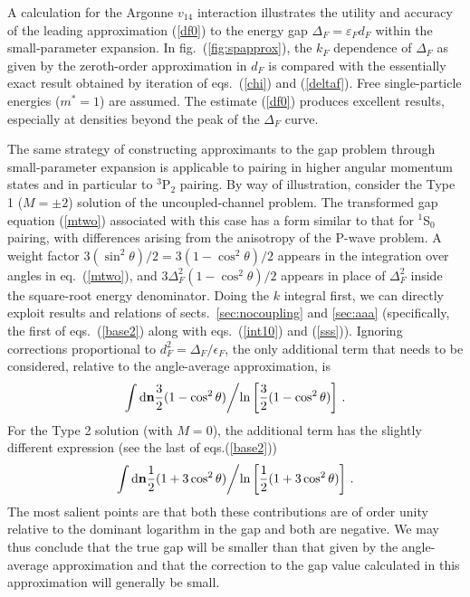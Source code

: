 A calculation for the Argonne $v_{14}$ interaction illustrates the
utility and accuracy of the leading approximation (\ref{df0}) to the
energy gap $\Delta_F=\varepsilon_Fd_F$ within the small-parameter expansion.
In fig.~(\ref{fig:spapprox}), the $k_F$ dependence of $\Delta_F$ as given
by the zeroth-order approximation in $d_F$ is compared with the essentially
exact result obtained by iteration of eqs.~(\ref{chi}) and (\ref{deltaf}).
Free single-particle energies ($m^*=1$) are assumed.
The estimate (\ref{df0}) produces excellent results,
especially at densities beyond the peak of the $\Delta_F$ curve.

The same strategy of constructing approximants to the gap problem
through small-parameter expansion is applicable to pairing in higher
angular momentum states and in particular to $^3$P$_2$ pairing.
By way of illustration, consider the Type 1 ($M=\pm2$) solution of the
uncoupled-channel problem.  The transformed gap equation (\ref{mtwo}) 
associated with this case has a form similar to that for $^1$S$_0$ 
pairing, with differences arising from the anisotropy of the P-wave 
problem.  A weight factor $3(\sin^2 \theta)/2=3(1-\cos^2 \theta)/2$
appears in the integration
over angles in eq.~(\ref{mtwo}), and $3\Delta_F^2(1-\cos^2 \theta)/2$
appears in place of $\Delta_F^2$ inside the square-root energy denominator.
Doing the $k$ integral first, we can directly exploit results
and relations of sects.~\ref{sec:nocoupling} and \ref{sec:aaa} 
(specifically, the first of eqs.~(\ref{base2}) along with 
eqs.~(\ref{int10}) and (\ref{sss})).
Ignoring corrections proportional to
$d_F^2 = \Delta_F/\epsilon_F$, the only additional term that
needs to be considered, relative to the angle-average approximation,
is
\begin{equation}
\int {\rm d} {\bf n} {3\over 2}(1-\cos^2\theta)\biggl/
\ln \left[{3 \over 2}(1-\cos^2\theta) \right]\, .
\end{equation}
For the Type 2 solution (with $M=0$), the additional term has the
slightly different expression (see the last of eqs.(\ref{base2}))
\begin{equation}
\int {\rm d} {\bf n} {1 \over 2}(1+ 3\cos^2\theta)\biggl/
\ln \left[ {1\over 2}(1+ 3\cos^2\theta) \right] \,.
\end{equation}
The most salient points are that both these contributions are of
order unity relative to the dominant logarithm in the gap and both 
are negative.  We may thus conclude that the true gap will be smaller 
than that given by the angle-average approximation and that the
correction to the gap value calculated in this approximation will 
generally be small.


